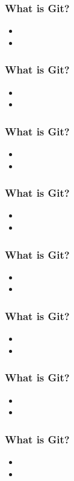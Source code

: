 \documentclass{beamer}
\begin{document}
\begin{frame}
\frametitle{What is Git?}
\begin{itemize}
\item  
\item
\end{itemize}
\end{frame}

\begin{frame}
\frametitle{What is Git?}
\begin{itemize}
\item  
\item
\end{itemize}
\end{frame}

\begin{frame}
\frametitle{What is Git?}
\begin{itemize}
\item  
\item
\end{itemize}
\end{frame}

\begin{frame}
\frametitle{What is Git?}
\begin{itemize}
\item  
\item
\end{itemize}
\end{frame}

\begin{frame}
\frametitle{What is Git?}
\begin{itemize}
\item  
\item
\end{itemize}
\end{frame}

\begin{frame}
\frametitle{What is Git?}
\begin{itemize}
\item  
\item
\end{itemize}
\end{frame}

\begin{frame}
\frametitle{What is Git?}
\begin{itemize}
\item  
\item
\end{itemize}
\end{frame}

\begin{frame}
\frametitle{What is Git?}
\begin{itemize}
\item  
\item
\end{itemize}
\end{frame}
\end{document}
